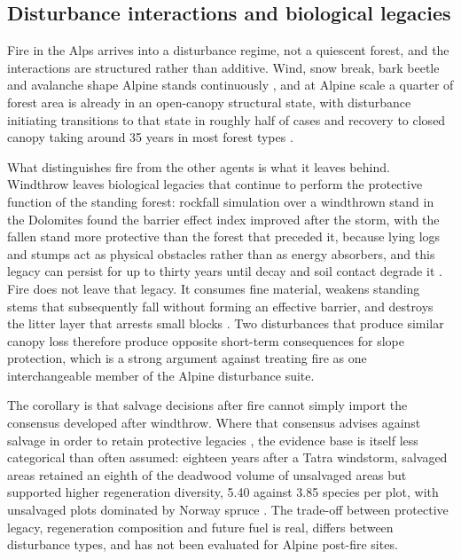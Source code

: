 \documentclass[11pt,a4paper]{article}
\begin{document}
\subsection{Disturbance interactions and biological legacies}

Fire in the Alps arrives into a disturbance regime, not a quiescent forest, and the interactions are structured rather than additive. Wind, snow break, bark beetle and avalanche shape Alpine stands continuously \citep{bebi_changes_2017}, and at Alpine scale a quarter of forest area is already in an open-canopy structural state, with disturbance initiating transitions to that state in roughly half of cases and recovery to closed canopy taking around 35 years in most forest types \citep{stritih_alternative_2023}.

What distinguishes fire from the other agents is what it leaves behind. Windthrow leaves biological legacies that continue to perform the protective function of the standing forest: rockfall simulation over a windthrown stand in the Dolomites found the barrier effect index improved after the storm, with the fallen stand more protective than the forest that preceded it, because lying logs and stumps act as physical obstacles rather than as energy absorbers, and this legacy can persist for up to thirty years until decay and soil contact degrade it \citep{costa_biological_2021}. Fire does not leave that legacy. It consumes fine material, weakens standing stems that subsequently fall without forming an effective barrier, and destroys the litter layer that arrests small blocks \citep{asteriou_assessing_2025}. Two disturbances that produce similar canopy loss therefore produce opposite short-term consequences for slope protection, which is a strong argument against treating fire as one interchangeable member of the Alpine disturbance suite.

The corollary is that salvage decisions after fire cannot simply import the consensus developed after windthrow. Where that consensus advises against salvage in order to retain protective legacies \citep{costa_biological_2021}, the evidence base is itself less categorical than often assumed: eighteen years after a Tatra windstorm, salvaged areas retained an eighth of the deadwood volume of unsalvaged areas but supported higher regeneration diversity, 5.40 against 3.85 species per plot, with unsalvaged plots dominated by Norway spruce \citep{seben_impact_2024}. The trade-off between protective legacy, regeneration composition and future fuel is real, differs between disturbance types, and has not been evaluated for Alpine post-fire sites.
\end{document}
